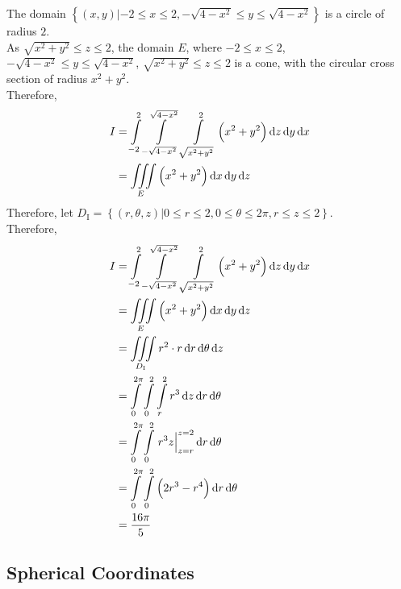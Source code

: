 \documentclass[fleqn, a4paper, 8pt, twoside]{amsart}
\theoremstyle{definition}
\theoremstyle{bluedefinition}
\theoremstyle{redtheorem}
\begin{document}
\begin{multicols}{2}
\begin{spacing}{0.7}
\begin{solution}
	The domain $\left\{ (x,y) | -2 \le x \le 2 , -\sqrt{4 - x^2} \le y \le \sqrt{4 - x^2} \right\}$ is a circle of radius $2$.\\
	As $\sqrt{x^2 + y^2} \le z \le 2$, the domain $E$, where $-2 \le x \le 2$, $-\sqrt{4 - x^2} \le y \le \sqrt{4 - x^2}$, $\sqrt{x^2 + y^2} \le z \le 2$ is a cone, with the circular cross section of radius $x^2 + y^2$.\\
	Therefore,
	\begin{align*}
		I & = \int\limits_{-2}^{2} \int\limits_{-\sqrt{4 - x^2}}^{\sqrt{4 - x^2}} \int\limits_{\sqrt{x^2 + y^2}}^{2} \left( x^2 + y^2 \right) \dif z \dif y \dif x \\
                  & = \iiint\limits_{E} \left( x^2 + y^2 \right) \dif x \dif y \dif z
	\end{align*}
	Therefore, let $D_{\mathrm{I}} = \left\{ (r,\theta,z) | 0 \le r \le 2 , 0 \le \theta \le 2 \pi , r \le z \le 2 \right\}$.\\
	Therefore,
	\begin{align*}
		I & = \int\limits_{-2}^{2} \int\limits_{-\sqrt{4 - x^2}}^{\sqrt{4 - x^2}} \int\limits_{\sqrt{x^2 + y^2}}^{2} \left( x^2 + y^2 \right) \dif z \dif y \dif x \\
                  & = \iiint\limits_{E} \left( x^2 + y^2 \right) \dif x \dif y \dif z                                                                                      \\
                  & = \iiint\limits_{D_{\mathrm{I}}} r^2 \cdot r \dif r \dif \theta \dif z                                                                                 \\
                  & = \int\limits_{0}^{2 \pi} \int\limits_{0}^{2} \int\limits_{r}^{2} r^3 \dif z \dif r \dif \theta                                                        \\
                  & = \int\limits_{0}^{2 \pi} \int\limits_{0}^{2} \left. r^3 z \right|_{z = r}^{z = 2} \dif r \dif \theta                                                  \\
                  & = \int\limits_{0}^{2 \pi} \int\limits_{0}^{2} \left( 2 r^3 - r^4 \right) \dif r \dif \theta                                                            \\
                  & = \frac{16 \pi}{5}
	\end{align*}
\end{solution}

\subsection{Spherical Coordinates}


\end{spacing}
\end{multicols}
\end{document}
